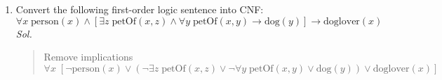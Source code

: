 \documentclass{article}
\theoremstyle{definition}
\newcommand{\<}{\langle}
\renewcommand{\>}{\rangle}
\renewcommand{\iff}{\Leftrightarrow}
\begin{document}
\begin{enumerate}[label=\textbf{\arabic*.}]
    \vspace{1em} 
    \textit{ Sol. }
    \vspace{1em}
    \begin{quote}
      \begin{enumerate}
        \item $\forall x\;\text{ball}(x) \land \text{heavy}(x) \land \text{hasThreeHoles}(x) \rightarrow \text{sportingEquipment}(x)$
        \item $\forall x\;\text{horse}(x) \land \text{domesticated}(x) \rightarrow \exists y\;\text{ownerOf}(x,y)$
        \item $\forall x\;\text{horse}(x) \land \exists y\;\text{riderOf}(x,y) \land \exists z\;\text{ownerOf}(x,z) \rightarrow y \neq z$
        \item $\forall x\;\text{horse}(x) \land \forall y\;\text{frog}(y) \rightarrow \text{movesFaster}(x,y)$
        \item $\forall x\;\text{digit}(x) \land \text{onHand}(x) \land \text{notThumb}(x) \rightarrow \text{finger}(x)$
        \item $\forall x\;\text{isoscelesTriangle}(x) \iff \text{polygon}(x) \land \text{hasEdges}(x,3) \land \text{hasVertices}(x,3) \land \exists a,b,c\;\text{lengthOf}(a,b,x) \land \text{lengthOf}(b,c,x) \land \text{lengthOf}(a,c,x) \land (\text{equals}(a,b) \lor \text{equals}(b,c) \lor \text{equals}(a,c)) \land \neg(\text{equals}(a,b) \land \text{equals}(b,c) \land \text{equals}(a,c))$
     \end{enumerate} 
    \end{quote}

    \newpage
  
  \item Convert the following first-order logic sentence into CNF:
  \begin{equation*}
    \forall x\;\text{person}(x) \land [\exists z \;\text{petOf}(x,z) \land \forall y \; \text{petOf}(x,y) \rightarrow \text{dog}(y)] \rightarrow \text{doglover}(x)
  \end{equation*}
  \vspace{1em} 
  \textit{ Sol. }
  \begin{quote}
    Remove implications
    \begin{equation*}
    \forall x\; [\lnot \text{person}(x) \lor (\lnot \exists z \;\text{petOf}(x,z) \lor \lnot \forall y \; \text{petOf}(x,y) \lor \text{dog}(y)) \lor \text{doglover}(x)]
    \end{equation*}


\end{quote}
\end{enumerate}
\end{document}
